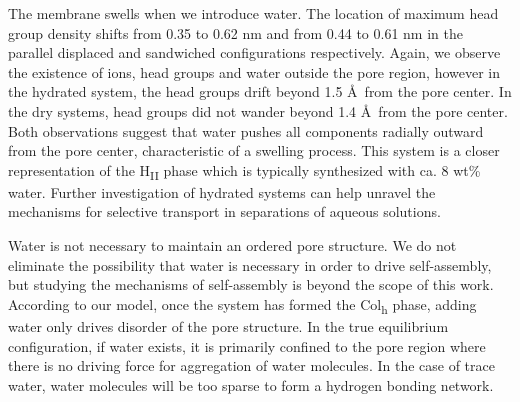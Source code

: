 \documentclass[journal=jpcbfk,manusciprt=article]{achemso}
\begin{document}
  The membrane swells when we introduce water. The location of maximum head
  group density shifts from 0.35 to 0.62 nm and from 0.44 to 0.61 nm in the
  parallel displaced and sandwiched configurations respectively. Again, we
  observe the existence of ions, head groups and water outside the pore region,
  however in the hydrated system, the head groups drift beyond 1.5 \AA~from the
  pore center. In the dry systems, head groups did not wander beyond 1.4 \AA~from
  the pore center. Both observations suggest that water pushes all components
  radially outward from the pore center, characteristic of a swelling process.  
  This system is a closer representation of the H\textsubscript{II} phase which
  is typically synthesized with ca. 8 wt\% water. Further investigation of
  hydrated systems can help unravel the mechanisms for selective transport in
  separations of aqueous solutions. 

  Water is not necessary to maintain an ordered pore structure. We do not
  eliminate the possibility that water is necessary in order to drive
  self-assembly, but studying the mechanisms of self-assembly is beyond the
  scope of this work. According to our model, once the system has formed the
  Col\textsubscript{h} phase, adding water only drives disorder of the pore
  structure. In the true equilibrium configuration, if water exists, it is
  primarily confined to the pore region where there is no driving force for
  aggregation of water molecules. In the case of trace water, water molecules
  will be too sparse to form a hydrogen bonding network.
\end{document}
